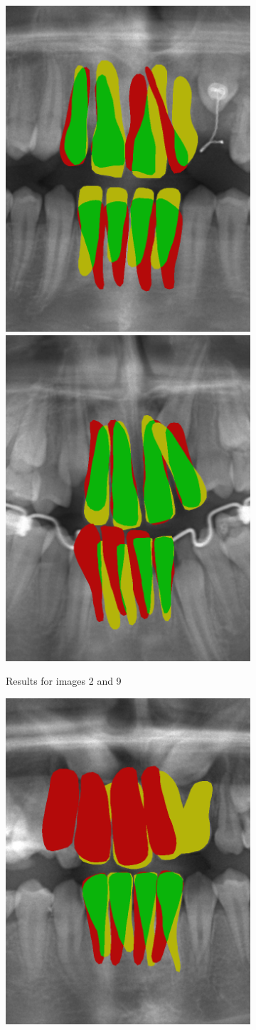 \documentclass[a4paper,titlepage,12pt]{article}
\begin{document}
\begin{figure}
	\begin{subfigure}{0.48\linewidth}
		\centering
		\includegraphics[width=0.48\columnwidth]{results/2i10}
		\includegraphics[width=0.48\columnwidth]{results/9i10}
		\caption{Results for images 2 and 9}
	\end{subfigure}
	\begin{subfigure}{0.48\linewidth}
		\centering
		\includegraphics[width=0.48\columnwidth]{results/5i10}

\end{subfigure}
\end{figure}
\end{document}
